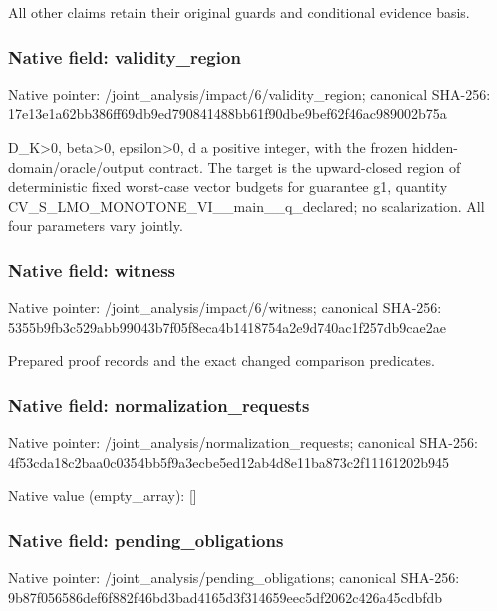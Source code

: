 \documentclass[10pt,a4paper]{article}
\begin{document}
\begingroup\raggedright\sloppy All other claims retain their original guards and conditional evidence basis.\par\endgroup

\subsubsection{Native field: validity\_\allowbreak{}region}
Native pointer: /joint\_\allowbreak{}analysis/impact/6/validity\_\allowbreak{}region; canonical SHA-256: 17e13e1a62bb386ff69db9ed790841488bb61f90dbe9bef62f46ac989002b75a

\begingroup\raggedright\sloppy D\_\allowbreak{}K>0,\allowbreak{} beta>0,\allowbreak{} epsilon>0,\allowbreak{} d a positive integer,\allowbreak{} with the frozen hidden-domain/\allowbreak{}oracle/\allowbreak{}output contract. The target is the upward-closed region of deterministic fixed worst-case vector budgets for guarantee g1,\allowbreak{} quantity CV\_\allowbreak{}S\_\allowbreak{}LMO\_\allowbreak{}MONOTONE\_\allowbreak{}VI\_\allowbreak{}\_\allowbreak{}main\_\allowbreak{}\_\allowbreak{}q\_\allowbreak{}declared;\allowbreak{} no scalarization. All four parameters vary jointly.\par\endgroup

\subsubsection{Native field: witness}
Native pointer: /joint\_\allowbreak{}analysis/impact/6/witness; canonical SHA-256: 5355b9fb3c529abb99043b7f05f8eca4b1418754a2e9d740ac1f257db9cae2ae

\begingroup\raggedright\sloppy Prepared proof records and the exact changed comparison predicates.\par\endgroup

\subsubsection{Native field: normalization\_\allowbreak{}requests}
Native pointer: /joint\_\allowbreak{}analysis/normalization\_\allowbreak{}requests; canonical SHA-256: 4f53cda18c2baa0c0354bb5f9a3ecbe5ed12ab4d8e11ba873c2f11161202b945

Native value (empty\_\allowbreak{}array): []

\subsubsection{Native field: pending\_\allowbreak{}obligations}
Native pointer: /joint\_\allowbreak{}analysis/pending\_\allowbreak{}obligations; canonical SHA-256: 9b87f056586def6f882f46bd3bad4165d3f314659eec5df2062c426a45cdbfdb
\end{document}
